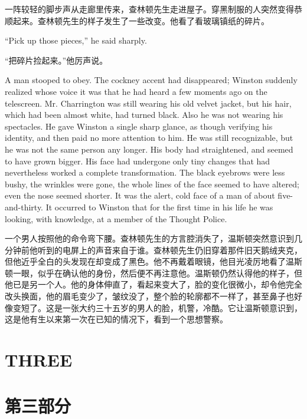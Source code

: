 \begin{paracol}{2}
\switchcolumn

一阵较轻的脚步声从走廊里传来，查林顿先生走进屋子。穿黑制服的人突然变得恭顺起来。查林顿先生的样子发生了一些改变。他看了看玻璃镇纸的碎片。

\switchcolumn*

``Pick up those pieces,'' he said sharply.

\switchcolumn

``把碎片捡起来。''他厉声说。

\switchcolumn*

A man stooped to obey. The cockney accent had disappeared; Winston
suddenly realized whose voice it was that he had heard a few moments ago
on the telescreen. Mr. Charrington was still wearing his old velvet
jacket, but his hair, which had been almost white, had turned black.
Also he was not wearing his spectacles. He gave Winston a single sharp
glance, as though verifying his identity, and then paid no more
attention to him. He was still recognizable, but he was not the same
person any longer. His body had straightened, and seemed to have grown
bigger. His face had undergone only tiny changes that had nevertheless
worked a complete transformation. The black eyebrows were less bushy,
the wrinkles were gone, the whole lines of the face seemed to have
altered; even the nose seemed shorter. It was the alert, cold face of a
man of about five-and-thirty. It occurred to Winston that for the first
time in his life he was looking, with knowledge, at a member of the
Thought Police.

\switchcolumn

一个男人按照他的命令弯下腰。查林顿先生的方言腔消失了，温斯顿突然意识到几分钟前他听到的电屏上的声音来自于谁。查林顿先生仍旧穿着那件旧天鹅绒夹克，但他近乎全白的头发现在却变成了黑色。他不再戴着眼镜，他目光凌厉地看了温斯顿一眼，似乎在确认他的身份，然后便不再注意他。温斯顿仍然认得他的样子，但他已是另一个人。他的身体伸直了，看起来变大了，脸的变化很微小，却令他完全改头换面，他的眉毛变少了，皱纹没了，整个脸的轮廓都不一样了，甚至鼻子也好像变短了。这是一张大约三十五岁的男人的脸，机警，冷酷。它让温斯顿意识到，这是他有生以来第一次在已知的情况下，看到一个思想警察。

\switchcolumn*

\clearpage
\part{THREE}\label{three}

\switchcolumn

\part*{第三部分}


\end{paracol}
